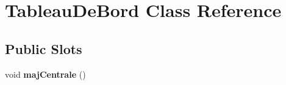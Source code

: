 \hypertarget{class_tableau_de_bord}{\section{Tableau\-De\-Bord Class Reference}
\label{class_tableau_de_bord}
}
\subsection*{Public Slots}
\begin{DoxyCompactItemize}
\item 
\hypertarget{class_tableau_de_bord_a9f185a8b68bfdf9df653f2b99574e1e7}{void {\bfseries maj\-Centrale} ()}\label{class_tableau_de_bord_a9f185a8b68bfdf9df653f2b99574e1e7}

\end{DoxyCompactItemize}

